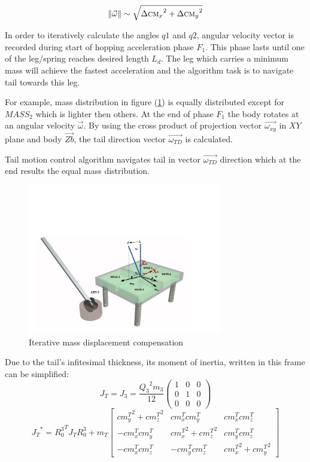 \begin{equation}
\left \| \vec{\omega} \right \|\sim \sqrt{{\Delta \textsc{cm}_x}^2+{\Delta \textsc{cm}_y}^2}
\end{equation}


In order to iteratively calculate the angles $q1$ and $q2$, angular velocity vector is recorded during start of hopping acceleration phase $F_1$. This phase lasts until one of the leg/spring reaches desired length $L_d$. The leg which carries a minimum mass will achieve the fastest acceleration and the algorithm task is to navigate tail towards this leg. 

For example, mass distribution in figure  (\ref{fig:imassCom}) is equally distributed except for $MASS_2$  which is lighter then others. At the end of phase $F_1$ the body rotates at an angular velocity $\vec{\omega}$. By using the cross product of projection vector $\vec{\omega_{xy}}$ in $XY$ plane and body $\vec{Zb}$, the tail direction vector $\vec{\omega_{TD}}$ is calculated. 

Tail motion control algorithm navigates tail in vector $\vec{\omega_{TD}}$ direction which at the end results the equal mass distribution.

\begin{figure}
	\centering
	\includegraphics[width=85mm]{./pictures/IterativeAlgorithm.pdf}
	\caption{Iterative mass displacement compensation}
	\label{fig:imassCom}
\end{figure}





Due to the tail's infitesimal thickness, its moment of inertia, written in this frame can be simplified:
\begin{equation}
J_T=J_3=\frac{{Q_3}^2 m_3}{12}\left(
\begin{array}{ccc}
 1 & 0 & 0 \\
 0 & 1 & 0 \\
 0 & 0 & 0
\end{array}
\right)
\end{equation} 
\small
\begin{equation}
{J_T}^*={R_0^3}^TJ_TR_0^3+m_T\begin{bmatrix}
{cm_y^T}^2 +{cm_z^T}^2& {cm_x^T}{cm_y^T}& {cm_x^T}{cm_z^T} \\ 
-{cm_x^T}{cm_y^T} & {cm_x^T}^2+{cm_z^T}^2 & {cm_y^T}{cm_z^T}\\ 
-{cm_x^T}{cm_z^T} & -{cm_y^T}{cm_z^T} & {cm_x^T}^2+{cm_y^T}^2
\end{bmatrix}
\end{equation}
\normalsize
